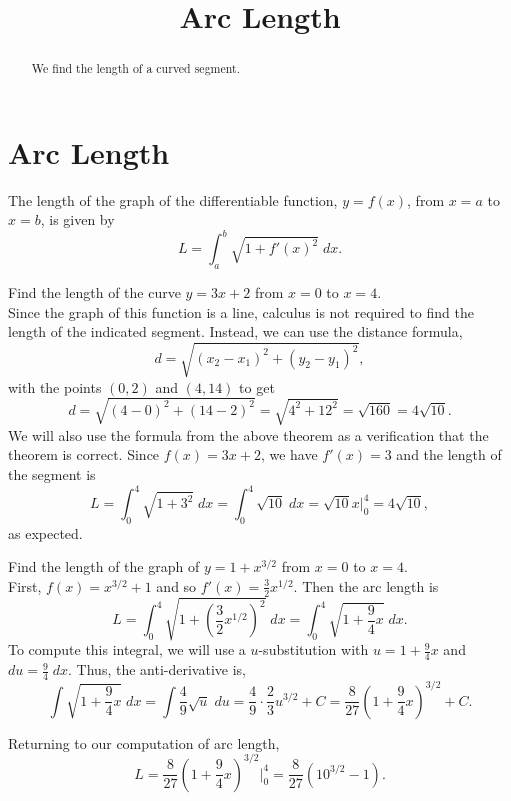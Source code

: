 \documentclass{ximera}
\title{Arc Length}
\begin{document}
\begin{abstract}
We find the length of a curved segment.
\end{abstract}

\maketitle

\section{Arc Length}

\begin{theorem} The length of the graph of the differentiable function, $y = f(x)$, from $x = a$ to $x = b$, is given by
\[
L = \int_a^b \sqrt{1+ f'(x)^2} \; dx.
\]
\end{theorem}

\begin{example}
Find the length of the curve $y = 3x + 2$ from $x = 0$ to $x = 4$. \\
Since the graph of this function is a line, calculus is not required to find the length of the indicated segment.
Instead, we can use the distance formula, 
\[
d = \sqrt{(x_2 - x_1)^2 + (y_2-y_1)^2},
\]
 with the points $(0,2)$ and $(4, 14)$
to get 
\[
d = \sqrt{(4-0)^2 + (14-2)^2} = \sqrt{4^2 + 12^2} = \sqrt{160} = 4\sqrt{10}.
\]
We will also use the formula from the above theorem as a verification that the theorem is correct.
Since $f(x) = 3x+2$, we have $f'(x) = 3$ and the length of the segment is
\[
L = \int_0^4 \sqrt{1 + 3^2} \;dx = \int_0^4 \sqrt{10} \; dx = \sqrt{10}x\bigg|_0^4 = 4\sqrt{10},
\]
as expected.
\end{example}



\begin{example} Find the length of the graph of 
$y = 1+ x^{3/2}$ 
from  $x = 0$ to $x = 4$.\\
First, $f(x) = x^{3/2} + 1$ and so $f'(x) = \frac32 x^{1/2}$. 
Then the arc length is
\[
L = \int_0^4 \sqrt{1 + \left(\frac32 x^{1/2}\right)^2} \; dx = \int_0^4 \sqrt{1 + \frac94 x} \;dx.
\]
To compute this integral, we will use a $u$-substitution with $u = 1+\frac94 x$ and $du = \frac94 \; dx$.
Thus, the anti-derivative is,
\[
\int \sqrt{1+\frac94 x} \; dx = \int \frac49 \sqrt u \; du = \frac49 \cdot \frac23 u^{3/2} + C = \frac{8}{27} \left(1 + \frac94 x \right)^{3/2} + C.
\]

Returning to our computation of arc length, 
\[
L = \frac{8}{27} \left(1 + \frac94 x \right)^{3/2} \bigg|_0^4 = \frac{8}{27} (10^{3/2} - 1).
\]
\end{example}
\end{document}
